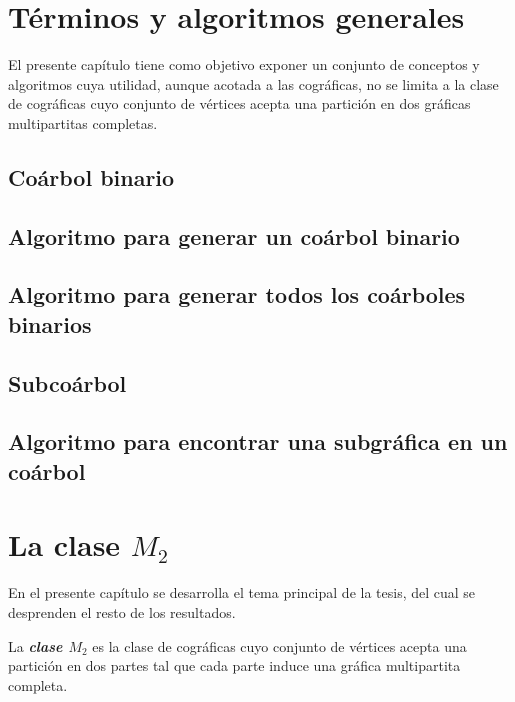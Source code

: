

\section{Términos y algoritmos generales}
    El presente capítulo tiene como objetivo exponer un conjunto de conceptos y algoritmos cuya utilidad, aunque acotada a las cográficas, no se limita a la clase de cográficas cuyo conjunto de vértices acepta una partición en dos gráficas multipartitas completas.
    \subsection{Coárbol binario}
        
    \subsection{Algoritmo para generar un coárbol binario}
        
    \subsection{Algoritmo para generar todos los coárboles binarios}
        
    \subsection{Subcoárbol}
        
    \subsection{Algoritmo para encontrar una subgráfica en un coárbol} \label{sec_AlgoSub}
        
    
    
\section{La clase $M_2$}

    En el presente capítulo se desarrolla el tema principal de la tesis, del cual se desprenden el resto de los resultados. 
    
    \begin{definition}
        La \textbf{\emph{clase $M_2$}} es la clase de cográficas cuyo conjunto de vértices acepta una partición en dos partes tal que cada parte induce una gráfica multipartita completa. %
    \end{definition}
    
